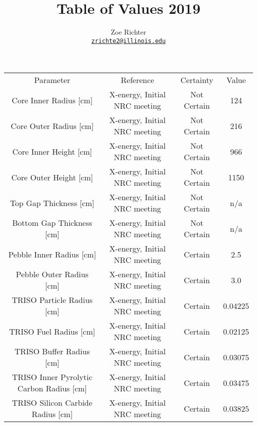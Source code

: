 \documentclass[letterpaper]{article}
\author{Zoe Richter
        \\ \href{mailto:zrichte2@illinois.edu}{\texttt{zrichte2@illinois.edu}}
}
\title{Table of Values 2019}
\begin{document}
\maketitle



\begin{adjustbox}{max width=\textwidth}
\centering
 \begin{tabular}{c c c c}
 Parameter & Reference & Certainty & Value \\

 Core Inner Radius [cm] & X-energy, Initial NRC meeting & Not Certain & 124 \\

 Core Outer Radius [cm] & X-energy, Initial NRC meeting & Not Certain & 216 \\

 Core Inner Height [cm] & X-energy, Initial NRC meeting & Not Certain & 966 \\

 Core Outer Height [cm] & X-energy, Initial NRC meeting & Not Certain & 1150 \\

 Top Gap Thickness [cm] & X-energy, Initial NRC meeting & Not Certain & n/a \\

 Bottom Gap Thickness [cm] & X-energy, Initial NRC meeting & Not Certain & n/a \\

 Pebble Inner Radius [cm] & X-energy, Initial NRC meeting & Certain & 2.5 \\

 Pebble Outer Radius [cm] & X-energy, Initial NRC meeting & Certain & 3.0 \\

  TRISO Particle Radius [cm] & X-energy, Initial NRC meeting & Certain & 0.04225 \\

 TRISO Fuel Radius [cm] & X-energy, Initial NRC meeting & Certain & 0.02125 \\

 TRISO Buffer Radius [cm] & X-energy, Initial NRC meeting & Certain & 0.03075 \\

 TRISO Inner Pyrolytic Carbon Radius [cm] & X-energy, Initial NRC meeting & Certain & 0.03475 \\

 TRISO Silicon Carbide Radius [cm] & X-energy, Initial NRC meeting & Certain & 0.03825 \\


\end{tabular}
\end{adjustbox}
\end{document}
